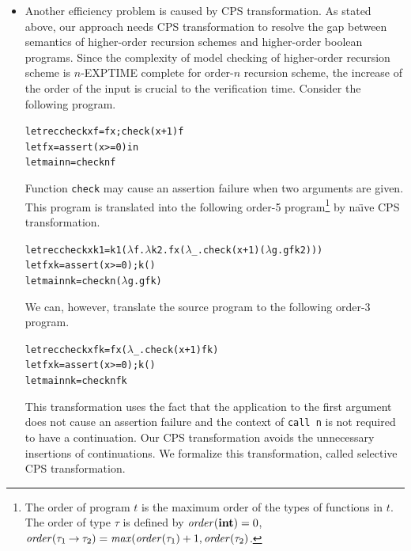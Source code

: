 \begin{itemize}
\item
Another efficiency problem is caused by CPS transformation.
As stated above, our approach needs CPS transformation to resolve the gap between
semantics of higher-order recursion schemes and higher-order boolean
programs.  Since the complexity of model checking of higher-order
recursion scheme is $n$-EXPTIME complete for order-$n$
recursion scheme, the increase of the order of the input is crucial to
the verification time.  Consider the following program.
\begin{alltt}
let rec check x f = f x; check (x+1) f
let f x = assert (x >= 0) in
let main n = check n f
\end{alltt}
Function \texttt{check} may cause an assertion failure when two arguments are
given.  This program is translated into the following order-5
program\footnote{The order of program $t$ is the maximum order of the
types of functions in $t$.  The order of type $\tau$ is defined by
$\mathit{order}(\mathbf{int})=0$, $\mathit{order}({\tau_1}\mathbin{\rightarrow}{\tau_2}) =
\mathit{max}(\mathit{order}(\tau_1)+1, \mathit{order}(\tau_2)$.}  by
na\"{\i}ve CPS transformation.
\begin{alltt}
let rec check x k1 = k1 (\(\lambda\)f.\(\lambda\)k2.f x (\(\lambda\)_.check (x+1) (\(\lambda\)g.g f k2)))
let f x k = assert (x >= 0); k ()
let main n k = check n (\(\lambda\)g. g f k)
\end{alltt}
We can, however, translate the source program to the following order-3 program.
\begin{alltt}
let rec check x f k = f x (\(\lambda\)_.check (x+1) f k)
let f x k = assert (x >= 0); k ()
let main n k = check n f k
\end{alltt}
This transformation uses the fact that the application to the first
argument does not cause an assertion failure and the context of
\texttt{call n} is not required to have a continuation.  Our CPS
transformation avoids the unnecessary insertions of continuations.  We
formalize this transformation, called selective CPS transformation.


\end{itemize}
